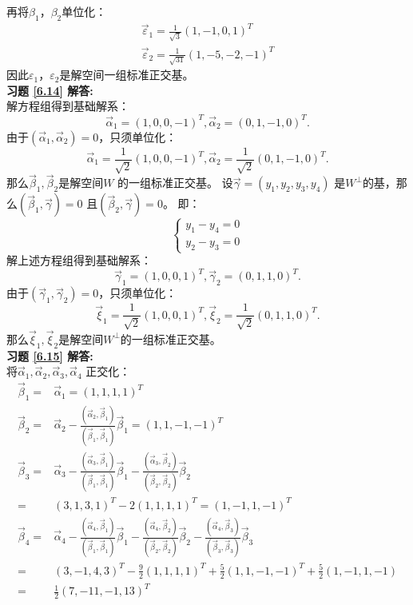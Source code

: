 \documentclass[a4paper]{book}
\begin{document}
再将$\beta_1$，$\beta_2$单位化：
\begin{align*}
\vec{\varepsilon}_1=\frac{1}{\sqrt{3}}(1,-1,0,1)^T\\
\vec{\varepsilon}_2=\frac{1}{\sqrt{31}}(1,-5,-2,-1)^T
\end{align*}
因此$\varepsilon_1$，$\varepsilon_2$是解空间一组标准正交基。\\
\textbf{习题 \ref{6.14} 解答:}\\
解方程组得到基础解系：
\begin{equation*}
\vec{\alpha}_1=(1,0,0,-1)^T,\vec{\alpha}_2=(0,1,-1,0)^T.
\end{equation*}
由于$(\vec{\alpha}_1,\vec{\alpha}_2)=0$，只须单位化：
\begin{equation*}
\vec{\alpha}_1=\frac{1}{\sqrt{2}}(1,0,0,-1)^T,
\vec{\alpha}_2=\frac{1}{\sqrt{2}}(0,1,-1,0)^T.
\end{equation*}
那么$\vec{\beta}_1,\vec{\beta}_2$是解空间$W$ 的一组标准正交基。
设$\vec{\gamma}=(y_1,y_2,y_3,y_4)$ 是$W^{\bot}$的基，那么$(\vec{\beta}_1,\vec{\gamma})=0$ 且$(\vec{\beta}_2,\vec{\gamma})=0$。
即：
\begin{equation*}
\begin{cases}
  y_1-y_4=0\\
  y_2-y_3=0
\end{cases}
\end{equation*}
解上述方程组得到基础解系：
\begin{equation*}
\vec{\gamma}_1=(1,0,0,1)^T,\vec{\gamma}_2=(0,1,1,0)^T.
\end{equation*}
由于$(\vec{\gamma}_1,\vec{\gamma}_2)=0$，只须单位化：
\begin{equation*}
\vec{\xi}_1=\frac{1}{\sqrt{2}}(1,0,0,1)^T,
\vec{\xi}_2=\frac{1}{\sqrt{2}}(0,1,1,0)^T.
\end{equation*}
那么$\vec{\xi}_1,\vec{\xi}_2$是解空间$W^{\bot}$的一组标准正交基。\\
\textbf{习题 \ref{6.15} 解答:}\\
将$\vec{\alpha}_1,\vec{\alpha}_2,\vec{\alpha}_3,\vec{\alpha}_4$ 正交化：
\begin{align*}
\vec{\beta}_1=&\vec{\alpha}_1=(1,1,1,1)^T\\
\vec{\beta}_2=&\vec{\alpha}_2-\frac{(\vec{\alpha}_2,\vec{\beta}_1)}{(\vec{\beta}_1,\vec{\beta}_1)}\vec{\beta}_1=(1,1,-1,-1)^T\\
\vec{\beta}_3=&\vec{\alpha}_3-\frac{(\vec{\alpha}_3,\vec{\beta}_1)}{(\vec{\beta}_1,\vec{\beta}_1)}\vec{\beta}_1-
              \frac{(\vec{\alpha}_3,\vec{\beta}_2)}{(\vec{\beta}_2,\vec{\beta}_2)}\vec{\beta}_2\\
             =&(3,1,3,1)^T-2(1,1,1,1)^T=(1,-1,1,-1)^T\\
\vec{\beta}_4=&\vec{\alpha}_4-\frac{(\vec{\alpha}_4,\vec{\beta}_1)}{(\vec{\beta}_1,\vec{\beta}_1)}\vec{\beta}_1-
               \frac{(\vec{\alpha}_4,\vec{\beta}_2)}{(\vec{\beta}_2,\vec{\beta}_2)}\vec{\beta}_2
                -\frac{(\vec{\alpha}_4,\vec{\beta}_3)}{(\vec{\beta}_3,\vec{\beta}_3)}\vec{\beta}_3\\
             =&(3,-1,4,3)^T-\frac{9}{2}(1,1,1,1)^T+\frac{5}{2}(1,1,-1,-1)^T+\frac{5}{2}(1,-1,1,-1)\\
             =&\frac{1}{2}(7,-11,-1,13)^T
\end{align*}
\end{document}
